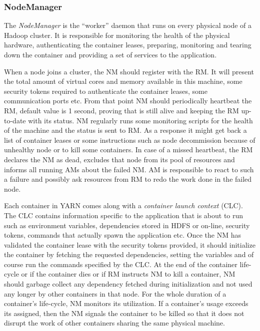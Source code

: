 \subsubsection{NodeManager}
\label{sssec:nm}
The \emph{NodeManager} is the ``worker'' daemon that runs on every
physical node of a Hadoop cluster. It is responsible for monitoring
the health of the physical hardware, authenticating the container
leases, preparing, monitoring and tearing down the container and
providing a set of services to the application.

When a node joins a cluster, the NM should register with the
RM. It will present the total amount of virtual cores and memory
available in this machine, some security tokens required to
authenticate the container leases, some communication ports etc. From
that point NM should periodically heartbeat the RM, default value is 1
second, proving that is still alive and keeping the RM up-to-date with
its status. NM regularly runs some monitoring scripts for the
health of the machine and the status is sent to RM. As a response it
might get back a list of container leases or some instructions such as
node decommission because of unhealthy node or to kill some
containers. In case of a missed heartbeat, the RM declares the NM as
dead, excludes that node from its pool of resources and informs all
running AMs about the failed NM. AM is responsible to react to such a
failure and possibly ask resources from RM to redo the work done in
the failed node.

Each container in YARN comes along with a \emph{container launch
  context} (CLC). The CLC contains information specific to the
application that is about to run such as environment variables,
dependencies stored in HDFS or on-line, security tokens, commands that
actually spawn the application etc. Once the NM has validated the
container lease with the security tokens provided, it should
initialize the container by fetching the requested dependencies,
setting the variables and of course run the commands specified by the
CLC. At the end of the container life-cycle or if the container dies
or if RM instructs NM to kill a container, NM should garbage collect
any dependency fetched during initialization and not used any
longer by other containers in that node. For the whole duration of a
container's life-cycle, NM monitors its utilization. If a container's
usage exceeds its assigned, then the NM signals the container to be
killed so that it does not disrupt the work of other containers
sharing the same physical machine. 

